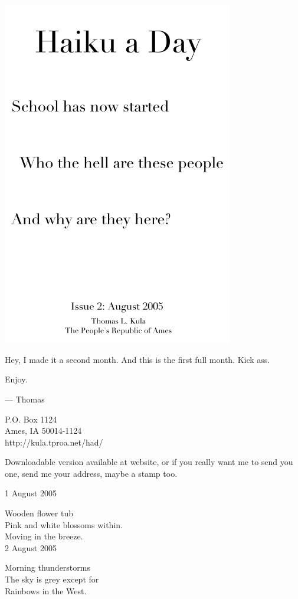 \documentclass[12pt]{article}
\begin{document}
\includegraphics[width=101mm]{frontpage.png}

\newpage

Hey, I made it a second month. And this is the first
full month. Kick ass.

Enjoy.

--- Thomas

P.O. Box 1124 \\
Ames, IA 50014-1124 \\
http://kula.tproa.net/had/

Downloadable version available at website, or if you really
want me to send you one, send me your address, maybe a
stamp too.

1 August 2005

Wooden flower tub \\
Pink and white blossoms within. \\
Moving in the breeze. \\

2 August 2005

Morning thunderstorms \\
The sky is grey except for \\
Rainbows in the West. \\
\end{document}
